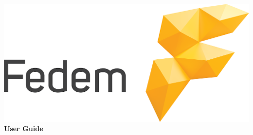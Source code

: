 %
%

%
%

\thispagestyle{empty}

\vspace*{5\baselineskip}
\begin{minipage}{0.8\textwidth}
  \includegraphics[width=\textwidth]{../img/Fedem} \\[1cm]
  {\huge\bf User Guide} \\[2mm]
  \bf\FedemVer
\end{minipage}

\renewcommand{\contentsname}{Table of Contents}
\tableofcontents
